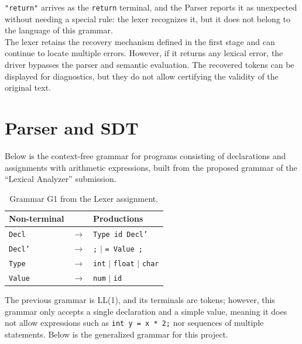 \documentclass[12pt,letterpaper]{article}
\newcommand{\cod}[1]{\texttt{#1}} %
\newcommand{\anchotabla}{0.9\textwidth} %
\begin{document}
\texttt{"return"} arrives as the \texttt{return} terminal, and the Parser reports it as unexpected without needing a special rule: the lexer recognizes it, but it does not belong to the language of this grammar.\\

The lexer retains the recovery mechanism defined in the first stage and can continue to locate multiple errors. However, if it returns any lexical error, the driver bypasses the parser and semantic evaluation. The recovered tokens can be displayed for diagnostics, but they do not allow certifying the validity of the original text.

\section{Parser and SDT}
Below is the context-free grammar for programs consisting of declarations and assignments with arithmetic expressions, built from the proposed grammar of the ``Lexical Analyzer'' submission.\\

\begin{table}[H]
\centering
\renewcommand{\arraystretch}{1.2}
\begin{tabular}{@{}p{0.20\dimexpr\anchotabla} p{0.08\dimexpr\anchotabla} p{0.68\dimexpr\anchotabla}@{}}
\toprule
\textbf{Non-terminal} & & \textbf{Productions} \\
\midrule
\cod{Decl}  & $\rightarrow$ & \cod{Type id Decl'} \\
\cod{Decl'} & $\rightarrow$ & \cod{;} $\mid$ \cod{= Value ;} \\
\cod{Type}  & $\rightarrow$ & \cod{int} $\mid$ \cod{float} $\mid$ \cod{char} \\
\cod{Value} & $\rightarrow$ & \cod{num} $\mid$ \cod{id} \\
\bottomrule
\end{tabular}
\caption{Grammar G1 from the Lexer assignment.}
\end{table}

The previous grammar is LL(1), and its terminals are tokens; however, this grammar only accepts a single declaration and a simple value, meaning it does not allow expressions such as \texttt{int y = x * 2;} nor sequences of multiple statements. Below is the generalized grammar for this project.
\end{document}

